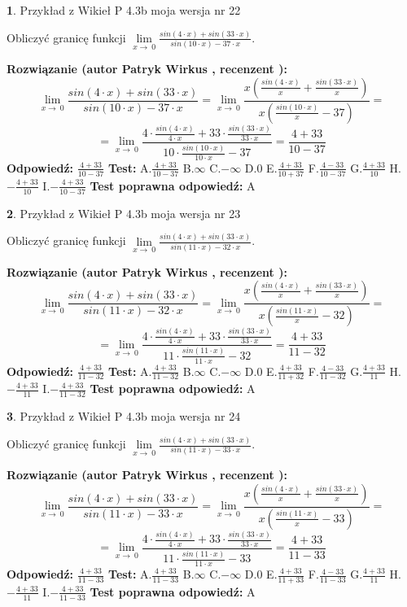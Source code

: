 \documentclass[12pt, a4paper]{article}
\theoremstyle{definition} %
\newtheorem{zad}{}
\newcommand{\zadStart}[1]{\begin{zad}#1\newline}
\newcommand{\zadStop}{\end{zad}}
\newcommand{\rozwStart}[2]{\noindent \textbf{Rozwiązanie (autor #1 , recenzent #2): }\newline}
\newcommand{\rozwStop}{\newline}
\newcommand{\odpStart}{\noindent \textbf{Odpowiedź:}\newline}
\newcommand{\odpStop}{\newline}
\newcommand{\testStart}{\noindent \textbf{Test:}\newline}
\newcommand{\testStop}{\newline}
\newcommand{\kluczStart}{\noindent \textbf{Test poprawna odpowiedź:}\newline}
\newcommand{\kluczStop}{\newline}
\begin{document}
\zadStart{Przykład z Wikieł P 4.3b moja wersja nr 22}


Obliczyć granicę funkcji $\lim\limits_{x\to\ 0}\frac{sin(4 \cdot x)+sin(33 \cdot x)}{sin(10 \cdot x)-37 \cdot x}$.
\zadStop
\rozwStart{Patryk Wirkus}{}
$$\lim\limits_{x\to\ 0}\frac{sin(4 \cdot x)+sin(33 \cdot x)}{sin(10 \cdot x)-37 \cdot x}=\lim\limits_{x\to\ 0}\frac{x(\frac{sin(4 \cdot x)}{x}+\frac{sin(33 \cdot x)}{x})}{x(\frac{sin(10 \cdot x)}{x}-37)}=$$
$$=\lim\limits_{x\to\ 0}\frac{4 \cdot \frac{sin(4 \cdot x)}{4 \cdot x}+33 \cdot \frac{sin(33 \cdot x)}{33 \cdot x}}{10 \cdot \frac{sin(10 \cdot x)}{10 \cdot x}-37}=\frac{4+33}{10-37}$$
\rozwStop
\odpStart
$\frac{4+33}{10-37}$
\odpStop
\testStart
A.$\frac{4+33}{10-37}$
B.$\infty$
C.$-\infty$
D.$0$
E.$\frac{4+33}{10+37}$
F.$\frac{4-33}{10-37}$
G.$\frac{4+33}{10}$
H.$-\frac{4+33}{10}$
I.$-\frac{4+33}{10-37}$
\testStop
\kluczStart
A
\kluczStop



\zadStart{Przykład z Wikieł P 4.3b moja wersja nr 23}


Obliczyć granicę funkcji $\lim\limits_{x\to\ 0}\frac{sin(4 \cdot x)+sin(33 \cdot x)}{sin(11 \cdot x)-32 \cdot x}$.
\zadStop
\rozwStart{Patryk Wirkus}{}
$$\lim\limits_{x\to\ 0}\frac{sin(4 \cdot x)+sin(33 \cdot x)}{sin(11 \cdot x)-32 \cdot x}=\lim\limits_{x\to\ 0}\frac{x(\frac{sin(4 \cdot x)}{x}+\frac{sin(33 \cdot x)}{x})}{x(\frac{sin(11 \cdot x)}{x}-32)}=$$
$$=\lim\limits_{x\to\ 0}\frac{4 \cdot \frac{sin(4 \cdot x)}{4 \cdot x}+33 \cdot \frac{sin(33 \cdot x)}{33 \cdot x}}{11 \cdot \frac{sin(11 \cdot x)}{11 \cdot x}-32}=\frac{4+33}{11-32}$$
\rozwStop
\odpStart
$\frac{4+33}{11-32}$
\odpStop
\testStart
A.$\frac{4+33}{11-32}$
B.$\infty$
C.$-\infty$
D.$0$
E.$\frac{4+33}{11+32}$
F.$\frac{4-33}{11-32}$
G.$\frac{4+33}{11}$
H.$-\frac{4+33}{11}$
I.$-\frac{4+33}{11-32}$
\testStop
\kluczStart
A
\kluczStop



\zadStart{Przykład z Wikieł P 4.3b moja wersja nr 24}


Obliczyć granicę funkcji $\lim\limits_{x\to\ 0}\frac{sin(4 \cdot x)+sin(33 \cdot x)}{sin(11 \cdot x)-33 \cdot x}$.
\zadStop
\rozwStart{Patryk Wirkus}{}
$$\lim\limits_{x\to\ 0}\frac{sin(4 \cdot x)+sin(33 \cdot x)}{sin(11 \cdot x)-33 \cdot x}=\lim\limits_{x\to\ 0}\frac{x(\frac{sin(4 \cdot x)}{x}+\frac{sin(33 \cdot x)}{x})}{x(\frac{sin(11 \cdot x)}{x}-33)}=$$
$$=\lim\limits_{x\to\ 0}\frac{4 \cdot \frac{sin(4 \cdot x)}{4 \cdot x}+33 \cdot \frac{sin(33 \cdot x)}{33 \cdot x}}{11 \cdot \frac{sin(11 \cdot x)}{11 \cdot x}-33}=\frac{4+33}{11-33}$$
\rozwStop
\odpStart
$\frac{4+33}{11-33}$
\odpStop
\testStart
A.$\frac{4+33}{11-33}$
B.$\infty$
C.$-\infty$
D.$0$
E.$\frac{4+33}{11+33}$
F.$\frac{4-33}{11-33}$
G.$\frac{4+33}{11}$
H.$-\frac{4+33}{11}$
I.$-\frac{4+33}{11-33}$
\testStop
\kluczStart
A
\kluczStop
\end{document}
